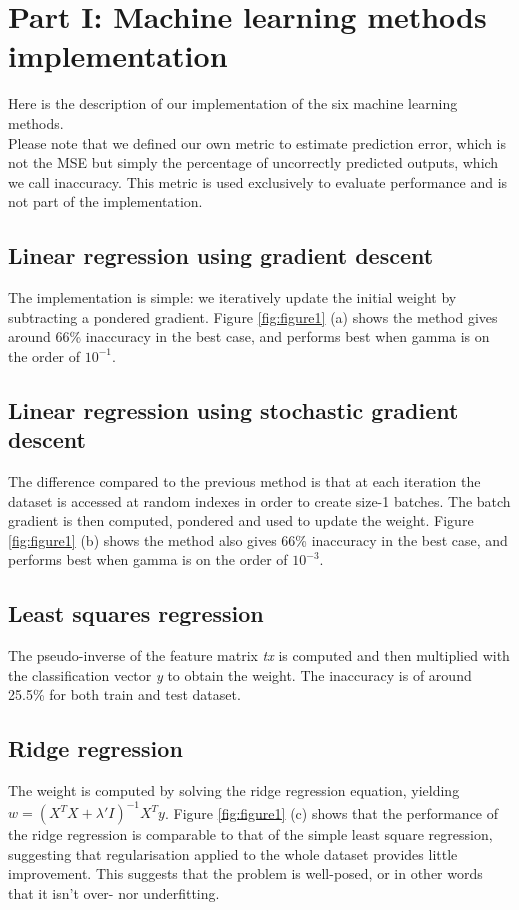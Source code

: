 \documentclass[10pt,conference,compsocconf]{IEEEtran}
\begin{document}
\section{Part I: Machine learning methods implementation}
Here is the description of our implementation of the six machine learning methods.\\
Please note that we defined our own metric to estimate prediction error, which is not the MSE but simply the percentage of uncorrectly predicted outputs, which we call inaccuracy. 
This metric is used exclusively to evaluate performance and is not part of the implementation.
 \subsection{Linear regression using gradient descent}
The implementation is simple: we iteratively update the initial weight by subtracting a pondered gradient.
Figure \ref{fig:figure1} (a) shows the method gives around 66\% inaccuracy in the best case, and performs best when gamma is on the order of $10^{-1}$. 
\subsection{Linear regression using stochastic gradient descent}
The difference compared to the previous method is that at each iteration the dataset is accessed at random indexes in order to
create size-1 batches. The batch gradient is then computed, pondered and used to update the weight.
Figure \ref{fig:figure1} (b) shows the method also gives 66\% inaccuracy in the best case, and performs best when gamma is on the order of $10^{-3}$. 
\subsection{Least squares regression}
The pseudo-inverse of the feature matrix \textit{tx} is computed and then multiplied with the classification vector \textit{y} to obtain the weight.
The inaccuracy is of around 25.5\% for both train and test dataset.
\subsection{Ridge regression}
The weight is computed by solving the ridge regression equation, yielding $w = (X^{T}X + \lambda'I)^{-1}X^{T}y$.
Figure \ref{fig:figure1} (c) shows that the performance of the ridge regression is comparable to that of the simple least square regression, suggesting that regularisation applied to the whole dataset provides little improvement. This suggests that the problem is well-posed, or in other words that it isn't over- nor underfitting.
\end{document}
